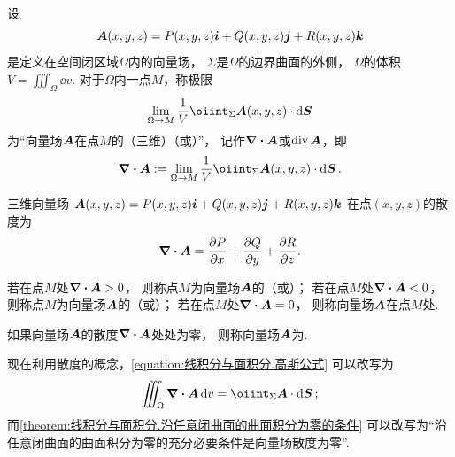 \begin{definition}[空间中的散度]
\def\defofdiv{\lim_{\Omega \to M} \frac{1}{V} \oiint_\Sigma \VectorInnerProductDot{\vb{A}(x,y,z)}{\dd{\vb{S}}}}%
设\begin{equation*}
	\boldsymbol{A}(x,y,z)=P(x,y,z)\boldsymbol{i}+Q(x,y,z)\boldsymbol{j}+R(x,y,z)\boldsymbol{k}
\end{equation*}是定义在空间闭区域\(\Omega\)内的向量场，
\(\Sigma\)是\(\Omega\)的边界曲面的外侧，
\(\Omega\)的体积\(V = \iiint_\Omega \dd{v}\).
对于\(\Omega\)内一点\(M\)，称极限\begin{equation*}
	\defofdiv
\end{equation*}为“向量场\(\boldsymbol{A}\)在点\(M\)的（三维）（或）”，
记作\(\div{\boldsymbol{A}}\)或\(\operatorname{div}\boldsymbol{A}\)，即\begin{equation*}
	\div{\vb{A}} \defeq \defofdiv.
\end{equation*}
\end{definition}

\begin{proposition}
三维向量场
\(\boldsymbol{A}(x,y,z)=P(x,y,z)\boldsymbol{i}+Q(x,y,z)\boldsymbol{j}+R(x,y,z)\boldsymbol{k}\)
在点\((x,y,z)\)的散度为\begin{equation*}
	\div{\boldsymbol{A}}
	= \pdv{P}{x}+\pdv{Q}{y}+\pdv{R}{z}.
\end{equation*}
\end{proposition}

\begin{definition}
若在点\(M\)处\(\div{\boldsymbol{A}}>0\)，
则称点\(M\)为向量场\(\boldsymbol{A}\)的（或）；
若在点\(M\)处\(\div{\boldsymbol{A}}<0\)，
则称点\(M\)为向量场\(\boldsymbol{A}\)的（或）；
若在点\(M\)处\(\div{\boldsymbol{A}}=0\)，
则称向量场\(\boldsymbol{A}\)在点\(M\)处.

如果向量场\(\boldsymbol{A}\)的散度\(\div{\boldsymbol{A}}\)处处为零，
则称向量场\(\boldsymbol{A}\)为.
\end{definition}

现在利用散度的概念，\cref{equation:线积分与面积分.高斯公式} 可以改写为
\begin{equation}\label{equation:线积分与面积分.高斯公式1}
	\iiint_\Omega \div{\vb{A}} \dd{v}
	= \oiint_\Sigma \VectorInnerProductDot{\vb{A}}{\dd{\vb{S}}};
\end{equation}
而\cref{theorem:线积分与面积分.沿任意闭曲面的曲面积分为零的条件}
可以改写为“沿任意闭曲面的曲面积分为零的充分必要条件是向量场散度为零”.

